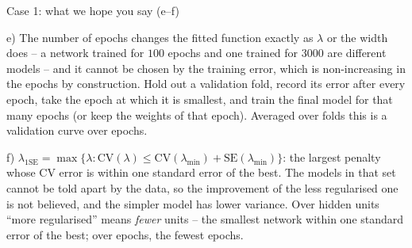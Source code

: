 \documentclass[10pt,aspectratio=169]{beamer}
\begin{document}
\begin{frame}{Case 1: what we hope you say (e--f)}
\small
{}
\pause
\begin{block}{e)}
The number of epochs changes the fitted function exactly as $\lambda$ or
the width does -- a network trained for $100$ epochs and one trained for
$3000$ are different models -- and it cannot be chosen by the training
error, which is non-increasing in the epochs by construction.  Hold out a
validation fold, record its error after every epoch, take the epoch at
which it is smallest, and train the final model for that many epochs (or
keep the weights of that epoch).  Averaged over folds this is a validation
curve over epochs.
\end{block}
\pause
\begin{block}{f)}
$\lambda_{1\mathrm{SE}}=\max\{\lambda:\mathrm{CV}(\lambda)\le
\mathrm{CV}(\lambda_{\min})+\mathrm{SE}(\lambda_{\min})\}$: the largest
penalty whose CV error is within one standard error of the best.  The
models in that set cannot be told apart by the data, so the improvement of
the less regularised one is not believed, and the simpler model has lower
variance.  Over hidden units ``more regularised'' means \emph{fewer} units
-- the smallest network within one standard error of the best; over
epochs, the fewest epochs.
\end{block}
\end{frame}

\end{document}
